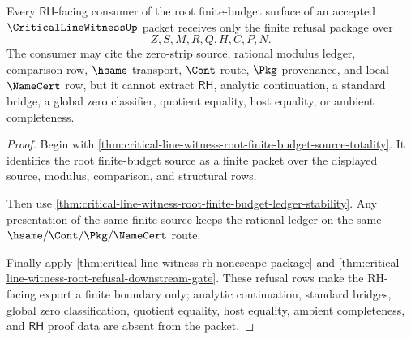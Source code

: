 \begin{theorem}
\label{thm:critical-line-witness-root-finite-budget-rh-refusal-nonescape}
Every $\mathsf{RH}$-facing consumer of the root finite-budget surface of an
accepted $\CriticalLineWitnessUp$ packet receives only the finite refusal
package over
$$
Z,S,M,R,Q,H,C,P,N.
$$
The consumer may cite the zero-strip source, rational modulus ledger,
comparison row, $\hsame$ transport, $\Cont$ route, $\Pkg$ provenance, and local
$\NameCert$ row, but it cannot extract $\mathsf{RH}$, analytic continuation, a
standard bridge, a global zero classifier, quotient equality, host equality, or
ambient completeness.
\end{theorem}
\begin{proof}
Begin with
\autoref{thm:critical-line-witness-root-finite-budget-source-totality}. It
identifies the root finite-budget source as a finite packet over the displayed
source, modulus, comparison, and structural rows.

Then use
\autoref{thm:critical-line-witness-root-finite-budget-ledger-stability}. Any
presentation of the same finite source keeps the rational ledger on the same
$\hsame/\Cont/\Pkg/\NameCert$ route.

Finally apply
\autoref{thm:critical-line-witness-rh-nonescape-package} and
\autoref{thm:critical-line-witness-root-refusal-downstream-gate}. These
refusal rows make the RH-facing export a finite boundary only; analytic
continuation, standard bridges, global zero classification, quotient equality,
host equality, ambient completeness, and $\mathsf{RH}$ proof data are absent
from the packet.
\end{proof}

